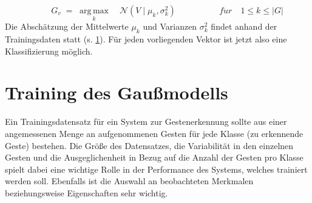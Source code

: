 \begin{equation} \label{finalClassification}
    \qquad \ G_v \; = \; {\underset {k}{\operatorname {arg\,max} }\quad
    \mathcal {N}(V\mid \mu_k ,\sigma^{2}_k)}\qquad \qquad \ \ \ \ \
    f\ddot{u}r\quad 1\leq k\leq |G|
\end{equation}
Die Abschätzung der Mittelwerte $\mu_k$ und Varianzen $\sigma_k^2$ findet anhand der Trainingsdaten statt (s. \ref{Training}). Für jeden vorliegenden Vektor ist jetzt also eine Klassifizierung möglich. 

\section{Training des Gaußmodells} \label{Training}
Ein Trainingsdatensatz für ein System zur Gestenerkennung sollte aus einer angemessenen Menge an aufgenommenen Gesten für jede Klasse (zu erkennende Geste) bestehen. Die Größe des Datensatzes, die Variabilität in den einzelnen Gesten und die Ausgeglichenheit in Bezug auf die Anzahl der Gesten pro Klasse spielt dabei eine wichtige Rolle in der Performance des Systems, welches trainiert werden soll. Ebenfalls ist die Auswahl an beobachteten Merkmalen beziehungsweise Eigenschaften sehr wichtig.~\cite{sampleSize}

